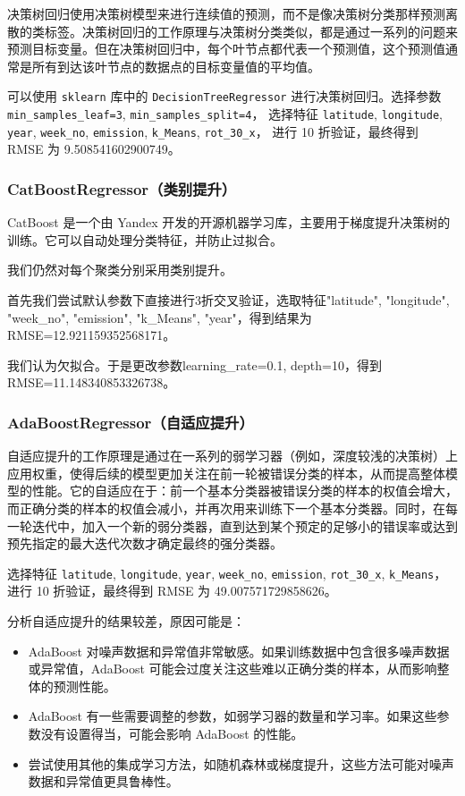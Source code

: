 \documentclass{ctexart}
\begin{document}
决策树回归使用决策树模型来进行连续值的预测，而不是像决策树分类那样预测离散的类标签。决策树回归的工作原理与决策树分类类似，都是通过一系列的问题来预测目标变量。但在决策树回归中，每个叶节点都代表一个预测值，这个预测值通常是所有到达该叶节点的数据点的目标变量值的平均值。

可以使用 \texttt{sklearn} 库中的 \texttt{DecisionTreeRegressor} 进行决策树回归。选择参数
\texttt{min\_samples\_leaf=3}, \texttt{min\_samples\_split=4}，
选择特征 \texttt{latitude}, \texttt{longitude}, \texttt{year}, \texttt{week\_no}, \texttt{emission}, \texttt{k\_Means}, \texttt{rot\_30\_x}，
进行 10 折验证，最终得到 RMSE 为 9.508541602900749。

\subsubsection{CatBoostRegressor（类别提升）}

CatBoost 是一个由 Yandex 开发的开源机器学习库，主要用于梯度提升决策树的训练。它可以自动处理分类特征，并防止过拟合。

我们仍然对每个聚类分别采用类别提升。

首先我们尝试默认参数下直接进行3折交叉验证，选取特征"latitude", "longitude", "week\_no", "emission", "k\_Means", "year"，得到结果为RMSE=12.921159352568171。

我们认为欠拟合。于是更改参数learning\_rate=0.1, depth=10，得到RMSE=11.148340853326738。

\subsubsection{AdaBoostRegressor（自适应提升）}

自适应提升的工作原理是通过在一系列的弱学习器（例如，深度较浅的决策树）上应用权重，使得后续的模型更加关注在前一轮被错误分类的样本，从而提高整体模型的性能。它的自适应在于：前一个基本分类器被错误分类的样本的权值会增大，而正确分类的样本的权值会减小，并再次用来训练下一个基本分类器。同时，在每一轮迭代中，加入一个新的弱分类器，直到达到某个预定的足够小的错误率或达到预先指定的最大迭代次数才确定最终的强分类器。

选择特征 \texttt{latitude}, \texttt{longitude}, \texttt{year}, \texttt{week\_no}, \texttt{emission}, \texttt{rot\_30\_x}, \texttt{k\_Means}，进行 10 折验证，最终得到 RMSE 为 49.007571729858626。

分析自适应提升的结果较差，原因可能是：

\begin{itemize}
      \item AdaBoost 对噪声数据和异常值非常敏感。如果训练数据中包含很多噪声数据或异常值，AdaBoost 可能会过度关注这些难以正确分类的样本，从而影响整体的预测性能。
      \item AdaBoost 有一些需要调整的参数，如弱学习器的数量和学习率。如果这些参数没有设置得当，可能会影响 AdaBoost 的性能。
      \item 尝试使用其他的集成学习方法，如随机森林或梯度提升，这些方法可能对噪声数据和异常值更具鲁棒性。
\end{itemize}
\end{document}
